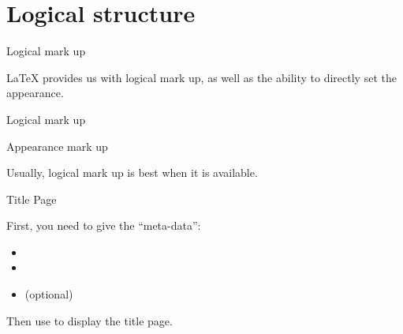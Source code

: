 
\section{Logical structure}

\begin{frame}[fragile]{Logical mark up}

  \LaTeX{} provides us with logical mark up, as well as the ability to
  directly set the appearance. 
  \begin{block}{Logical mark up}
      \\
  \end{block}
  \begin{block}{Appearance mark up}
      \\
  \end{block}
  Usually, logical mark up is best when it is available.

\end{frame}

\begin{frame}{Title Page}

  First, you need to give the \enquote{meta-data}:
  \begin{itemize}
    \item {}
    \item {}
    \item {} (optional)
  \end{itemize}
   Then use  to display the title page.
   
   \vspace{2 em}
   

\end{frame}

